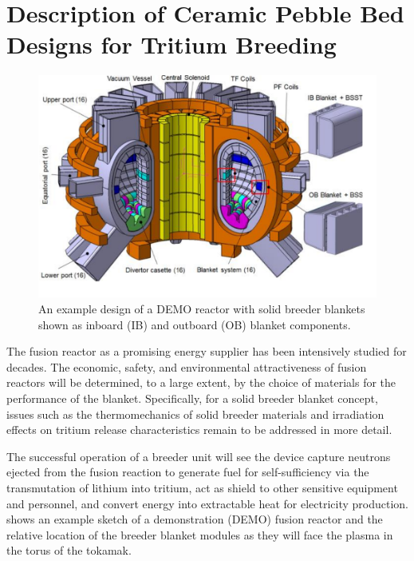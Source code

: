 \section{Description of Ceramic Pebble Bed Designs for Tritium Breeding}
\begin{figure}[ht]
	\centering
	\includegraphics[width=\singleimagewidth]{figures/demo} 
	\caption{An example design of a DEMO reactor with solid breeder blankets shown as inboard (IB) and outboard (OB) blanket components.}
	\label{fig:demo}
\end{figure}


The fusion reactor as a promising energy supplier has been intensively studied for decades. The economic, safety, and environmental attractiveness of fusion reactors will be determined, to a large extent, by the choice of materials for the performance of the blanket. Specifically, for a solid breeder blanket concept, issues such as the thermomechanics of solid breeder materials and irradiation effects on tritium release characteristics remain to be addressed in more detail. %

The successful operation of a breeder unit will see the device capture neutrons ejected from the fusion reaction to generate fuel for self-sufficiency via the transmutation of lithium into tritium, act as shield to other sensitive equipment and personnel, and convert energy into extractable heat for electricity production.  shows an example sketch of a demonstration (DEMO) fusion reactor and the relative location of the breeder blanket modules as they will face the plasma in the torus of the tokamak. %

